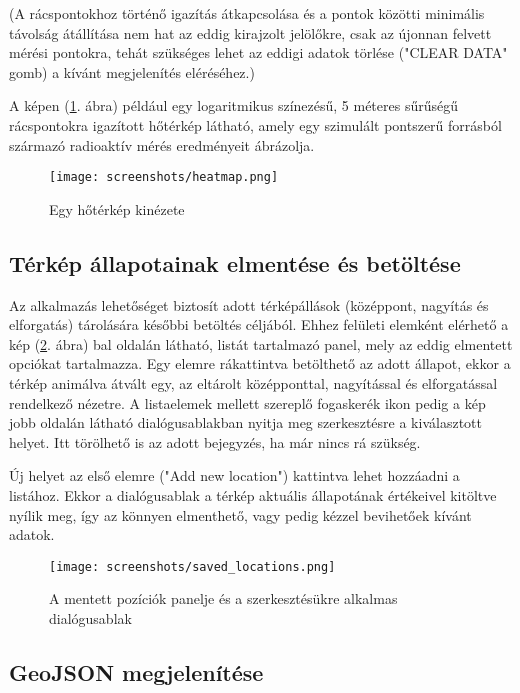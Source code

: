 (A rácspontokhoz történő igazítás átkapcsolása és a pontok közötti minimális
távolság átállítása nem hat az eddig kirajzolt jelölőkre, csak az újonnan
felvett mérési pontokra, tehát szükséges lehet az eddigi adatok törlése ("CLEAR
DATA" gomb) a kívánt megjelenítés eléréséhez.)

A képen (\ref{fig:heatmap}. ábra) például egy logaritmikus színezésű, 5 méteres
sűrűségű rácspontokra igazított hőtérkép látható, amely egy szimulált pontszerű
forrásból származó radioaktív mérés eredményeit ábrázolja.

\begin{figure}[H]
  \texttt{[image: screenshots/heatmap.png]}
  \caption{Egy hőtérkép kinézete}
  \label{fig:heatmap}
\end{figure}


\subsection{Térkép állapotainak elmentése és betöltése}

Az alkalmazás lehetőséget biztosít adott térképállások (középpont, nagyítás és
elforgatás) tárolására későbbi betöltés céljából. Ehhez felületi elemként
elérhető a kép (\ref{fig:saved_locations}. ábra) bal oldalán látható, listát
tartalmazó panel, mely az eddig elmentett opciókat tartalmazza. Egy elemre
rákattintva betölthető az adott állapot, ekkor a térkép animálva átvált egy,
az eltárolt középponttal, nagyítással és elforgatással rendelkező nézetre. A
listaelemek mellett szereplő fogaskerék ikon pedig a kép jobb oldalán látható
dialógusablakban nyitja meg szerkesztésre a kiválasztott helyet. Itt törölhető
is az adott bejegyzés, ha már nincs rá szükség.

Új helyet az első elemre ("Add new location") kattintva lehet hozzáadni a
listához. Ekkor a dialógusablak a térkép aktuális állapotának értékeivel
kitöltve nyílik meg, így az könnyen elmenthető, vagy pedig kézzel bevihetőek
kívánt adatok.

\begin{figure}[H]
  \texttt{[image: screenshots/saved\_locations.png]}
  \caption{A mentett pozíciók panelje és a szerkesztésükre alkalmas dialógusablak}
  \label{fig:saved_locations}
\end{figure}


\subsection{GeoJSON megjelenítése}

